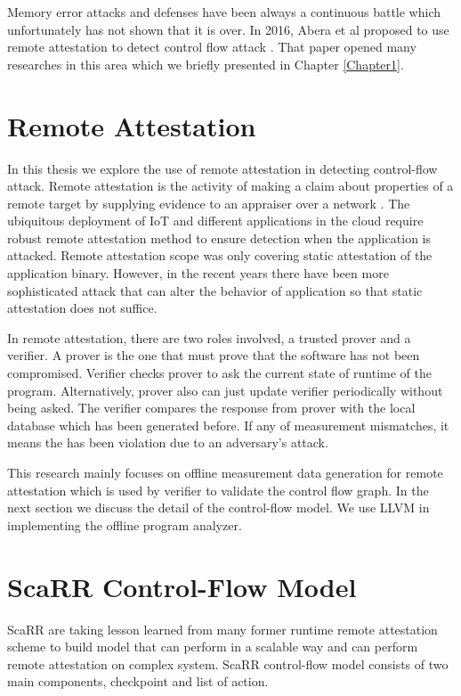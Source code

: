 Memory error attacks and defenses have been always a continuous battle which unfortunately has not shown that it is over. In 2016, Abera et al proposed to use remote attestation to detect control flow attack \cite{aberaCFLATControlFlowAttestation2016}. 
That paper opened many researches in this area which we briefly presented in Chapter \ref{Chapter1}.
 
\section{Remote Attestation}
\label{sec:remote-attestation}

In this thesis we explore the use of remote attestation in detecting control-flow attack. Remote attestation is the activity of making a claim about properties of a remote target by supplying evidence to an appraiser over a network \cite{cokerPrinciplesRemoteAttestation2011a}. The ubiquitous deployment of IoT and different applications in the cloud require robust remote attestation method to ensure detection when the application is attacked.  Remote attestation scope was only covering static attestation of the application binary. However, in the recent years there have been more sophisticated attack that can alter the behavior of application so that static attestation does not suffice. 

In remote attestation, there are two roles involved, a trusted prover and a verifier. A prover is the one that must prove that the software has not been compromised. Verifier checks prover to ask the current state of runtime of the program. Alternatively, prover also can just update verifier periodically without being asked. The verifier compares the response from prover with the local database which has been generated before. If any of measurement mismatches, it means the has been violation due to an adversary's attack.

This research mainly focuses on offline measurement data generation for remote attestation which is used by verifier to validate the control flow graph. In the next section we discuss the detail of the control-flow model. We use LLVM in implementing the offline program analyzer.

\section{ScaRR Control-Flow Model} 
\label{sec:scarr-model}

ScaRR \cite{toffaliniScaRRScalableRuntime2019} are taking lesson learned from many former runtime remote attestation scheme to build model that can perform in a scalable way and can perform remote attestation on complex system. ScaRR control-flow model consists of two main components, checkpoint and list of action. 

